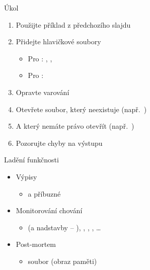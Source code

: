 \begin{frame}{Úkol}

  \begin{enumerate}
    \item Použijte příklad z předchozího slajdu

    \item Přidejte hlavičkové soubory
    \begin{itemize}
      \item Pro : , ,
      \item Pro : 
    \end{itemize}

    \item Opravte varování
    \item Otevřete soubor, který neexistuje (např.\ )
    \item A který nemáte právo otevřít (např.\ )
    \item Pozorujte chyby na výstupu
  \end{enumerate}

\end{frame}

\begin{frame}{Ladění funkčnosti}

  \begin{itemize}
    \item Výpisy
    \begin{itemize}
      \item {} a příbuzné
    \end{itemize}

    \pause

    \item Monitorování chování
    \begin{itemize}
      \item {} (a nadstavby -- \qtc), , ,
	, \dots
    \end{itemize}

    \pause

    \item Post-mortem
    \begin{itemize}
      \item {} soubor (obraz paměti)
    \end{itemize}
  \end{itemize}

\end{frame}

